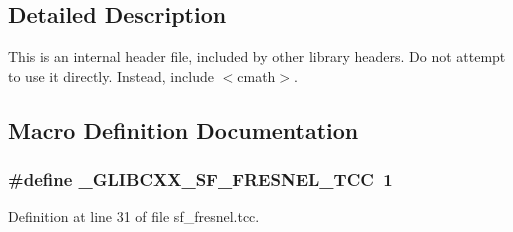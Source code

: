 \subsection{Detailed Description}
This is an internal header file, included by other library headers. Do not attempt to use it directly. Instead, include $<$cmath$>$. 

\subsection{Macro Definition Documentation}
\subsubsection[{\texorpdfstring{\+\_\+\+G\+L\+I\+B\+C\+X\+X\+\_\+\+S\+F\+\_\+\+F\+R\+E\+S\+N\+E\+L\+\_\+\+T\+CC}{_GLIBCXX_SF_FRESNEL_TCC}}]{\setlength{\rightskip}{0pt plus 5cm}\#define \+\_\+\+G\+L\+I\+B\+C\+X\+X\+\_\+\+S\+F\+\_\+\+F\+R\+E\+S\+N\+E\+L\+\_\+\+T\+CC~1}\hypertarget{sf__fresnel_8tcc_a157a41147fba868fe64f89d64525188e}{}\label{sf__fresnel_8tcc_a157a41147fba868fe64f89d64525188e}


Definition at line 31 of file sf\+\_\+fresnel.\+tcc.

